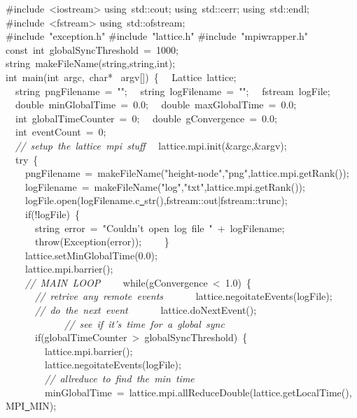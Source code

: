 {\ttfamily \raggedright \footnotesize
\#include\ <{}iostream>{}
using\ std::cout;
using\ std::cerr;
using\ std::endl;
\ \\
\#include\ <{}fstream>{}
using\ std::ofstream;
\ \\
\#include\ "{}exception.h"{}
\#include\ "{}lattice.h"{}
\#include\ "{}mpiwrapper.h"{}
\ \\
const\ int\ globalSyncThreshold\ =\ 1000;
\ \\
string\ makeFileName(string,string,int);
\ \\
int\ main(int\ argc,\ char* \ argv[])\ \{
\ \ Lattice\ lattice;
\ \ string\ pngFilename\ =\ "{}"{};
\ \ string\ logFilename\ =\ "{}"{};
\ \ fstream\ logFile;
\ \ double\ minGlobalTime\ =\ 0.0;
\ \ double\ maxGlobalTime\ =\ 0.0;
\ \ int\ globalTimeCounter\ =\ 0;
\ \ double\ gConvergence\ =\ 0.0;
\ \ int\ eventCount\ =\ 0;
\ \\
\ \ \textsl{//\ setup\ the\ lattice\ mpi\ stuff}
\ \ lattice.mpi.init(\&argc,\&argv);
\ \\
\ \ try\ \{
\ \\
\ \ \ \ pngFilename\ =\ makeFileName("{}height-{}node"{},"{}png"{},lattice.mpi.getRank());
\ \ \ \ logFilename\ =\ makeFileName("{}log"{},"{}txt"{},lattice.mpi.getRank());
\ \\
\ \ \ \ logFile.open(logFilename.c\underline\ str(),fstream::out|fstream::trunc);
\ \\
\ \ \ \ if(!logFile)\ \{
\ \ \ \ \ \ string\ error\ =\ "{}Couldn't\ open\ log\ file\ "{}\ +\ logFilename;
\ \ \ \ \ \ throw(Exception(error));
\ \ \ \ \}
\ \\
\ \ \ \ lattice.setMinGlobalTime(0.0);
\ \\
\ \ \ \ lattice.mpi.barrier();
\ \\
\ \ \ \ \textsl{//\ MAIN\ LOOP}
\ \ \ \ while(gConvergence\ <{}\ 1.0)\ \{
\ \ \ \ \ \ \textsl{//\ retrive\ any\ remote\ events}
\ \ \ \ \ \ lattice.negoitateEvents(logFile);
\ \\
\ \ \ \ \ \ \textsl{//\ do\ the\ next\ event}
\ \ \ \ \ \ lattice.doNextEvent();
\ \ \ \ \ \
\ \ \ \ \ \ \textsl{//\ see\ if\ it's\ time\ for\ a\ global\ sync}
\ \ \ \ \ \ if(globalTimeCounter\ >{}\ globalSyncThreshold)\ \{
\ \ \ \ \ \ \ \ lattice.mpi.barrier();
\ \\
\ \ \ \ \ \ \ \ lattice.negoitateEvents(logFile);
\ \\
\ \ \ \ \ \ \ \ \textsl{//\ allreduce\ to\ find\ the\ min\ time}
\ \ \ \ \ \ \ \ minGlobalTime\ =\ lattice.mpi.allReduceDouble(lattice.getLocalTime(),MPI\underline\ MIN);
}
